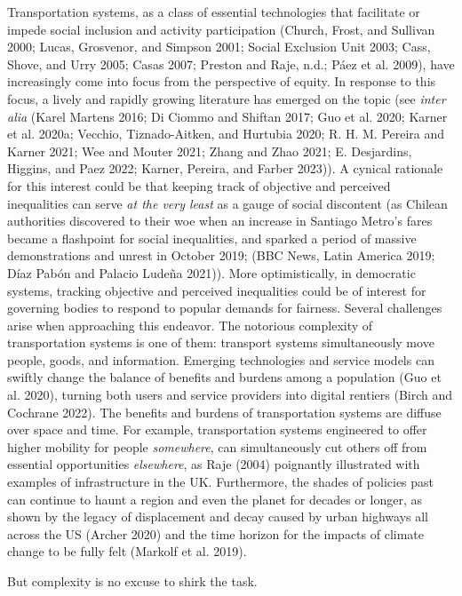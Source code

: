 \documentclass[12pt, oneside]{report}
\begin{document}
Transportation systems, as a class of essential technologies that
facilitate or impede social inclusion and activity participation
(Church, Frost, and Sullivan 2000; Lucas, Grosvenor, and Simpson 2001;
Social Exclusion Unit 2003; Cass, Shove, and Urry 2005; Casas 2007;
Preston and Raje, n.d.; Páez et al. 2009), have increasingly come into
focus from the perspective of equity. In response to this focus, a
lively and rapidly growing literature has emerged on the topic (see
\emph{inter alia} (Karel Martens 2016; Di Ciommo and Shiftan 2017; Guo
et al. 2020; Karner et al. 2020a; Vecchio, Tiznado-Aitken, and Hurtubia
2020; R. H. M. Pereira and Karner 2021; Wee and Mouter 2021; Zhang and
Zhao 2021; E. Desjardins, Higgins, and Paez 2022; Karner, Pereira, and
Farber 2023)). A cynical rationale for this interest could be that
keeping track of objective and perceived inequalities can serve \emph{at
the very least} as a gauge of social discontent (as Chilean authorities
discovered to their woe when an increase in Santiago Metro's fares
became a flashpoint for social inequalities, and sparked a period of
massive demonstrations and unrest in October 2019; (BBC News, Latin
America 2019; Díaz Pabón and Palacio Ludeña 2021)). More optimistically,
in democratic systems, tracking objective and perceived inequalities
could be of interest for governing bodies to respond to popular demands
for fairness. Several challenges arise when approaching this endeavor.
The notorious complexity of transportation systems is one of them:
transport systems simultaneously move people, goods, and information.
Emerging technologies and service models can swiftly change the balance
of benefits and burdens among a population (Guo et al. 2020), turning
both users and service providers into digital rentiers (Birch and
Cochrane 2022). The benefits and burdens of transportation systems are
diffuse over space and time. For example, transportation systems
engineered to offer higher mobility for people \emph{somewhere}, can
simultaneously cut others off from essential opportunities
\emph{elsewhere}, as Raje (2004) poignantly illustrated with examples of
infrastructure in the UK. Furthermore, the shades of policies past can
continue to haunt a region and even the planet for decades or longer, as
shown by the legacy of displacement and decay caused by urban highways
all across the US (Archer 2020) and the time horizon for the impacts of
climate change to be fully felt (Markolf et al. 2019).

But complexity is no excuse to shirk the task.
\end{document}

